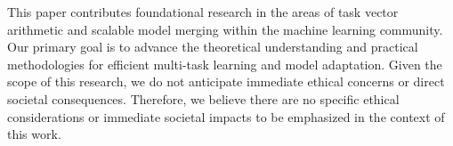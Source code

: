 This paper contributes foundational research in the areas of task vector arithmetic and scalable model merging within the machine learning community. Our primary goal is to advance the theoretical understanding and practical methodologies for efficient multi-task learning and model adaptation. Given the scope of this research, we do not anticipate immediate ethical concerns or direct societal consequences. Therefore, we believe there are no specific ethical considerations or immediate societal impacts to be emphasized in the context of this work.